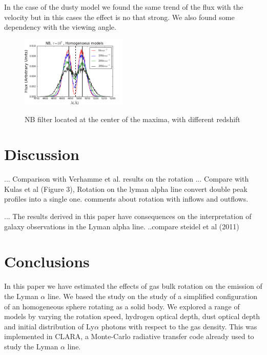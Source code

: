 \documentclass[usenatbib]{mn2e}
\begin{document}
In the case of the dusty model we found the same trend of the flux with the velocity 
but in this cases the effect is no that strong. 
We also found some dependency with the viewing angle.

\begin{figure}
  \includegraphics[width=0.45\textwidth]{NB7tDifVHOM.png}
 \label{figure:efvsNeufeld}\caption{NB filter located at the center of the maxima, with different redshift} 
\end{figure}

\section{Discussion}
\label{sec:discussion}

... Comparison with Verhamme et al. results on the rotation
... Compare with Kulas et al (Figure 3), Rotation on the lyman alpha line convert double peak profiles into a single one. comments about rotation with inflows and outflows. 

... The results derived in this paper have consequences on the
interpretation of galaxy observations in the Lyman alpha line.
..compare steidel et al (2011)



\section{Conclusions}
In this paper we have estimated the effects of gas bulk rotation on
the emission  of the Lyman $\alpha$ line. We based the study on the
study of a simplified configuration of an homogeneous sphere rotating
as a solid body. We explored  a range of models by varying the
rotation speed, hydrogen optical depth, dust optical depth and initial
distribution of Ly$\alpha$ photons with respect to the gas
density. This was implemented in CLARA, a Monte-Carlo
radiative transfer code already used to study the Lyman $\alpha$
line. 
\end{document}
